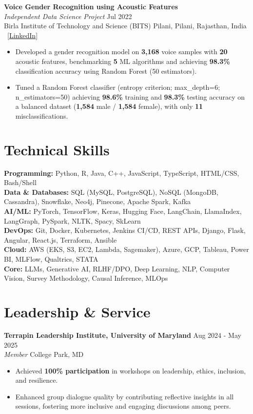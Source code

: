 \documentclass[11pt,letterpaper]{article}
\newcommand{\cvsection}[1]{\section*{#1}}
\begin{document}
\vspace{6pt}
\textbf{Voice Gender Recognition using Acoustic Features}\\
\textit{Independent Data Science Project} \hfill Jul 2022\\
Birla Institute of Technology and Science (BITS) Pilani, Pilani, Rajasthan, India \textbar\ \href{https://www.linkedin.com/in/namit-shrivastava-baab47204/details/projects/}{[LinkedIn]}
\begin{itemize}[leftmargin=16pt, noitemsep, topsep=2pt]
    \item Developed a gender recognition model on \textbf{3,168} voice samples with \textbf{20} acoustic features, benchmarking \textbf{5} ML algorithms and achieving \textbf{98.3\%} classification accuracy using Random Forest (50 estimators).
    \item Tuned a Random Forest classifier (entropy criterion; max\_depth=6; n\_estimators=50) achieving \textbf{98.6\%} training and \textbf{98.3\%} testing accuracy on a balanced dataset (\textbf{1,584} male / \textbf{1,584} female), with only \textbf{11} misclassifications.
\end{itemize}





\cvsection{Technical Skills}

\textbf{Programming:} Python, R, Java, C++, JavaScript, TypeScript, HTML/CSS, Bash/Shell\\
\textbf{Data \& Databases:} SQL (MySQL, PostgreSQL), NoSQL (MongoDB, Cassandra), Snowflake, Neo4j, Pinecone, Apache Spark, Kafka\\
\textbf{AI/ML:} PyTorch, TensorFlow, Keras, Hugging Face, LangChain, LlamaIndex, LangGraph, PySpark, NLTK, Spacy, SkLearn\\
\textbf{DevOps:} Git, Docker, Kubernetes, Jenkins CI/CD, REST APIs, Django, Flask, Angular, React.js, Terraform, Ansible\\
\textbf{Cloud:} AWS (EKS, S3, EC2, Lambda, Sagemaker), Azure, GCP, Tableau, Power BI, MLFlow, Qualtrics, STATA\\
\textbf{Core:} LLMs, Generative AI, RLHF/DPO, Deep Learning, NLP, Computer Vision, Survey Methodology, Causal Inference, MLOps

\cvsection{Leadership \& Service}

\textbf{Terrapin Leadership Institute, University of Maryland} \hfill Aug 2024 - May 2025\\
\textit{Member} \hfill College Park, MD
\begin{itemize}[leftmargin=16pt, noitemsep, topsep=2pt]
    \item Achieved \textbf{100\% participation} in workshops on leadership, ethics, inclusion, and resilience.
    \item Enhanced group dialogue quality by contributing reflective insights in all sessions, fostering more inclusive and engaging
discussions among peers.
\end{itemize}
\end{document}
